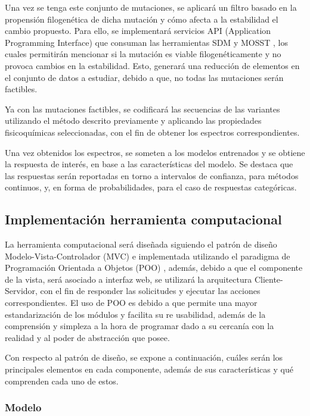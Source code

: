 Una vez se tenga este conjunto de mutaciones, se aplicará un filtro basado en la propensión filogenética de dicha mutación y cómo afecta a la estabilidad el cambio propuesto. Para ello, se implementará servicios API (Application Programming Interface) que consuman las herramientas SDM \cite{Pandurangan2017} y MOSST \cite{Olivera-Nappa2011}, los cuales permitirán mencionar si la mutación es viable filogenéticamente y no provoca cambios en la estabilidad. Esto, generará una reducción de elementos en el conjunto de datos a estudiar, debido a que, no todas las mutaciones serán factibles. 

Ya con las mutaciones factibles, se codificará las secuencias de las variantes utilizando el método descrito previamente y aplicando las propiedades fisicoquímicas seleccionadas, con el fin de obtener los espectros correspondientes. 

Una vez obtenidos los espectros, se someten a los modelos entrenados y se obtiene la respuesta de interés, en base a las características del modelo. Se destaca que las respuestas serán reportadas en torno a intervalos de confianza, para métodos continuos, y, en forma de probabilidades, para el caso de respuestas categóricas.
 
\subsection{Implementación herramienta computacional}

La herramienta computacional será diseñada siguiendo el patrón de diseño Modelo-Vista-Controlador (MVC) \cite{krasner1988description} e implementada utilizando el paradigma de Programación Orientada a Objetos (POO) \cite{wegner1990concepts}, además, debido a que el componente de la vista, será asociado a interfaz web, se utilizará la arquitectura Cliente-Servidor, con el fin de responder las solicitudes y ejecutar las acciones correspondientes. El uso de POO es debido a que permite una mayor estandarización de los módulos y facilita su re usabilidad, además de la comprensión y simpleza a la hora de programar dado a su cercanía con la realidad y al poder de abstracción que posee.

Con respecto al patrón de diseño, se  expone  a continuación, cuáles serán los principales elementos en cada componente, además de sus características y qué comprenden cada uno de estos.

\subsubsection{Modelo}

